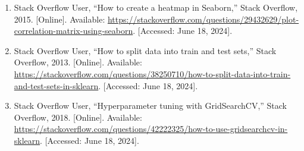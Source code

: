 \documentclass[journal]{IEEEtran}
\begin{document}
\begin{enumerate}
    \item Stack Overflow User, “How to create a heatmap in Seaborn,” Stack Overflow, 2015. [Online]. Available: \url{https://stackoverflow.com/questions/29432629/plot-correlation-matrix-using-seaborn}. [Accessed: June 18, 2024].

    \item Stack Overflow User, “How to split data into train and test sets,” Stack Overflow, 2013. [Online]. Available: \url{https://stackoverflow.com/questions/38250710/how-to-split-data-into-train-and-test-sets-in-sklearn}. [Accessed: June 18, 2024].

    \item Stack Overflow User, “Hyperparameter tuning with GridSearchCV,” Stack Overflow, 2018. [Online]. Available: \url{https://stackoverflow.com/questions/42222325/how-to-use-gridsearchcv-in-sklearn}. [Accessed: June 18, 2024].

\end{enumerate}
\end{document}
